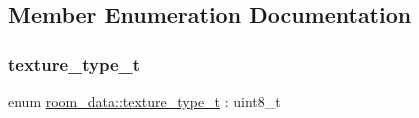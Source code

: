 \subsection{Member Enumeration Documentation}
\mbox{\label{structroom__data_a9552b46091ee649079e41f04f9543b8e}} 
\subsubsection{\texorpdfstring{texture\+\_\+type\+\_\+t}{texture\_type\_t}}
{\footnotesize\ttfamily enum \hyperlink{structroom__data_a9552b46091ee649079e41f04f9543b8e}{room\+\_\+data\+::texture\+\_\+type\+\_\+t} \+: uint8\+\_\+t}

